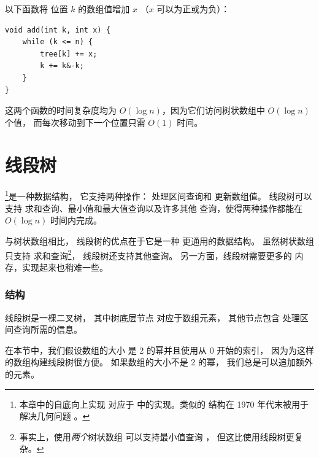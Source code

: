 以下函数将
位置 $k$ 的数组值增加 $x$
（$x$ 可以为正或为负）：
\begin{lstlisting}
void add(int k, int x) {
    while (k <= n) {
        tree[k] += x;
        k += k&-k;
    }
}
\end{lstlisting}

这两个函数的时间复杂度均为
$O(\log n)$，因为它们访问树状数组中
$O(\log n)$ 个值，
而每次移动到下一个位置只需 $O(1)$ 时间。

\section{线段树}


\footnote{本章中的自底向上实现
对应于 \cite{sta06} 中的实现。类似的
结构在 1970 年代末被用于解决几何问题 \cite{ben80}。}是一种数据结构，
它支持两种操作：
处理区间查询和
更新数组值。
线段树可以支持
求和查询、最小值和最大值查询以及许多其他
查询，使得两种操作都能在 $O(\log n)$ 时间内完成。

与树状数组相比，
线段树的优点在于它是一种
更通用的数据结构。
虽然树状数组只支持
求和查询\footnote{事实上，使用\emph{两个}树状数组
可以支持最小值查询 \cite{dim15}，
但这比使用线段树更复杂。}，
线段树还支持其他查询。
另一方面，线段树需要更多的
内存，实现起来也稍难一些。

\subsubsection{结构}

线段树是一棵二叉树，
其中树底层节点
对应于数组元素，
其他节点包含
处理区间查询所需的信息。

在本节中，我们假设数组的大小
是 2 的幂并且使用从 0 开始的索引，
因为为这样的数组构建线段树很方便。
如果数组的大小不是 2 的幂，
我们总是可以追加额外的元素。

